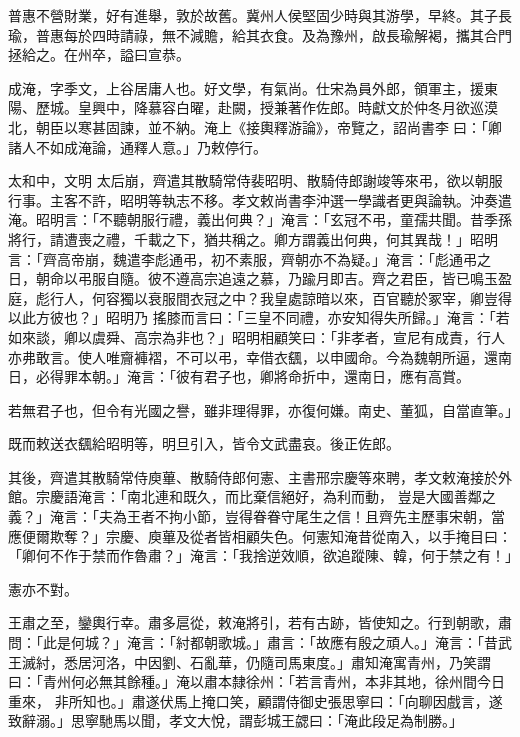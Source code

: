 \begin{pinyinscope}
 普惠不營財業，好有進舉，敦於故舊。冀州人侯堅固少時與其游學，早終。其子長瑜，普惠每於四時請祿，無不減贍，給其衣食。及為豫州，啟長瑜解褐，攜其合門拯給之。在州卒，謚曰宣恭。



 成淹，字季文，上谷居庸人也。好文學，有氣尚。仕宋為員外郎，領軍主，援東陽、歷城。皇興中，降慕容白曜，赴闕，授兼著作佐郎。時獻文於仲冬月欲巡漠北，朝臣以寒甚固諫，並不納。淹上《接輿釋游論》，帝覽之，詔尚書李曰：「卿諸人不如成淹論，通釋人意。」乃敕停行。



 太和中，文明
 太后崩，齊遣其散騎常侍裴昭明、散騎侍郎謝竣等來弔，欲以朝服行事。主客不許，昭明等執志不移。孝文敕尚書李沖選一學識者更與論執。沖奏遣淹。昭明言：「不聽朝服行禮，義出何典？」淹言：「玄冠不弔，童孺共聞。昔季孫將行，請遭喪之禮，千載之下，猶共稱之。卿方謂義出何典，何其異哉！」昭明言：「齊高帝崩，魏遣李彪通弔，初不素服，齊朝亦不為疑。」淹言：「彪通弔之日，朝命以弔服自隨。彼不遵高宗追遠之慕，乃踰月即吉。齊之君臣，皆已鳴玉盈庭，彪行人，何容獨以衰服間衣冠之中？我皇處諒暗以來，百官聽於冢宰，卿豈得以此方彼也？」昭明乃
 搖膝而言曰：「三皇不同禮，亦安知得失所歸。」淹言：「若如來談，卿以虞舜、高宗為非也？」昭明相顧笑曰：「非孝者，宣尼有成責，行人亦弗敢言。使人唯齎褲褶，不可以弔，幸借衣颻，以申國命。今為魏朝所逼，還南日，必得罪本朝。」淹言：「彼有君子也，卿將命折中，還南日，應有高賞。



 若無君子也，但令有光國之譽，雖非理得罪，亦復何嫌。南史、董狐，自當直筆。」



 既而敕送衣颻給昭明等，明旦引入，皆令文武盡哀。後正佐郎。



 其後，齊遣其散騎常侍庾蓽、散騎侍郎何憲、主書邢宗慶等來聘，孝文敕淹接於外館。宗慶語淹言：「南北連和既久，而比棄信絕好，為利而動，
 豈是大國善鄰之義？」淹言：「夫為王者不拘小節，豈得眷眷守尾生之信！且齊先主歷事宋朝，當應便爾欺奪？」宗慶、庾蓽及從者皆相顧失色。何憲知淹昔從南入，以手掩目曰：「卿何不作于禁而作魯肅？」淹言：「我捨逆效順，欲追蹤陳、韓，何于禁之有！」



 憲亦不對。



 王肅之至，鑾輿行幸。肅多扈從，敕淹將引，若有古跡，皆使知之。行到朝歌，肅問：「此是何城？」淹言：「紂都朝歌城。」肅言：「故應有殷之頑人。」淹言：「昔武王滅紂，悉居河洛，中因劉、石亂華，仍隨司馬東度。」肅知淹寓青州，乃笑謂曰：「青州何必無其餘種。」淹以肅本隸徐州：「若言青州，本非其地，徐州間今日重來，
 非所知也。」肅遂伏馬上掩口笑，顧謂侍御史張思寧曰：「向聊因戲言，遂致辭溺。」思寧馳馬以聞，孝文大悅，謂彭城王勰曰：「淹此段足為制勝。」




\end{pinyinscope}
